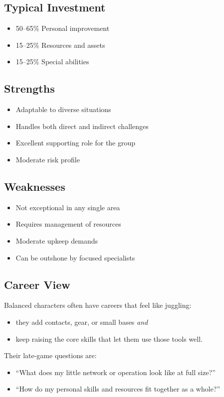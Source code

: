 \subsection*{Typical Investment}
\begin{itemize}
\item 50--65\% Personal improvement
\item 15--25\% Resources and assets
\item 15--25\% Special abilities
\end{itemize}

\subsection*{Strengths}
\begin{itemize}
\item Adaptable to diverse situations
\item Handles both direct and indirect challenges
\item Excellent supporting role for the group
\item Moderate risk profile
\end{itemize}

\subsection*{Weaknesses}
\begin{itemize}
\item Not exceptional in any single area
\item Requires management of resources
\item Moderate upkeep demands
\item Can be outshone by focused specialists
\end{itemize}

\subsection*{Career View}

Balanced characters often have careers that feel like juggling:
\begin{itemize}
  \item they add contacts, gear, or small bases \emph{and}
  \item keep raising the core skills that let them use those tools well.
\end{itemize}

Their late-game questions are:
\begin{itemize}
  \item ``What does my little network or operation look like at full size?''
  \item ``How do my personal skills and resources fit together as a whole?'' 
\end{itemize}

